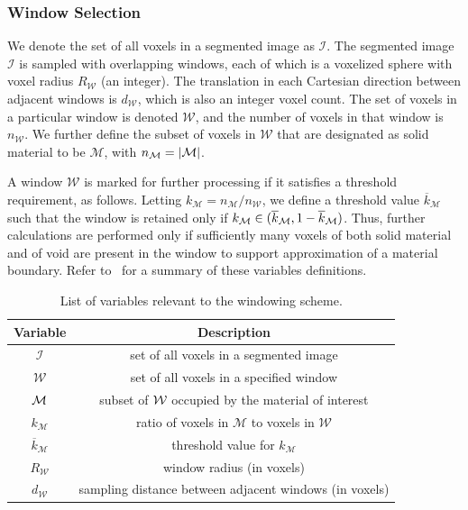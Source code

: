 \subsubsection{Window Selection}

We denote the set of all voxels in a segmented image as $\mathcal{I}$. The segmented image  $\mathcal{I}$ is sampled with overlapping windows, each of which is a voxelized sphere with voxel radius $R_{\mathcal{W}}$ (an integer). The translation in each Cartesian direction between adjacent windows is $d_{\mathcal{W}}$, which is also an integer voxel count. The set of voxels in a particular window is denoted $\mathcal{W}$, and the number of voxels in that window is $n_{\mathcal{W}}$. We further define the subset of voxels in $\mathcal{W}$ that are designated as solid material to be $\mathcal{M}$, with $n_{\mathcal{M}} = | \mathcal{M} |$.

A window $\mathcal{W}$ is marked for further processing if it satisfies a threshold requirement, as follows.  Letting $k_{\mathcal{M}} = n_{\mathcal{M}}/n_{\mathcal{W}}$, we define a threshold value $\overline{k}_{\mathcal{M}}$ such that the window is retained only if $k_{\mathcal{M}} \in (\overline{k}_{\mathcal{M}}, 1 - \overline{k}_{\mathcal{M}})$.  Thus, further calculations are performed only if sufficiently many voxels of both solid material and of void are present in the window to support approximation of a material boundary. Refer to~ for a summary of these variables definitions.

\begin{linenomath}\begin{table}[htbp!]
 \centering
   \begin{tabular}{|c||c|}
   \hline
   {\textbf{Variable}} & \textbf{Description} \\ \hline \hline
   $\mathcal{I}$ & set of all voxels in a segmented image \\ \hline
   $\mathcal{W}$ & set of all voxels in a specified window \\ \hline
   $\mathcal{M}$ & subset of $\mathcal{W}$ occupied by the material of interest\\ \hline
   {$k_{\mathcal{M}}$} & ratio of voxels in $\mathcal{M}$ to voxels in $\mathcal{W}$\\ \hline
   {$\overline{k}_{\mathcal{M}}$ \rule{0mm}{4mm}} & threshold value for $k_{\mathcal{M}}$ \\ \hline 
   $R_{\mathcal{W}}$ & window radius (in voxels) \\ \hline
   $d_{\mathcal{W}}$ & sampling distance between adjacent windows (in voxels) \\ \hline  
\end{tabular}
\caption{List of variables relevant to the windowing scheme.}
\label{tab:window}
\end{table}\end{linenomath}

